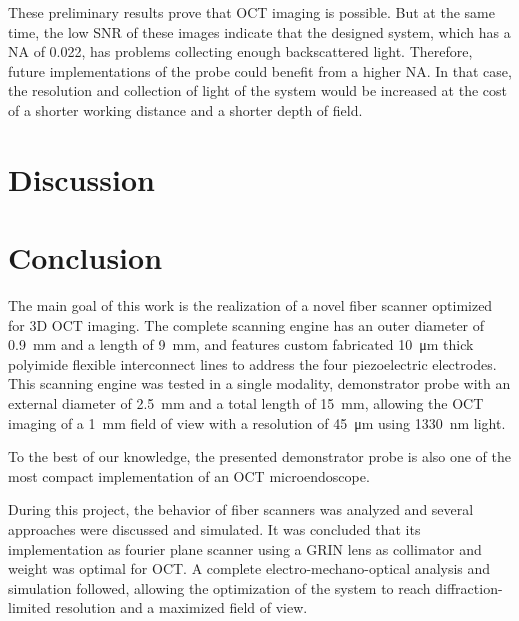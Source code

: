 \documentclass[10pt]{iopart}
\begin{document}
These preliminary results prove that OCT imaging is possible. But at the same time, the low SNR of these images indicate that the designed system, which has a NA of 0.022, has problems collecting enough backscattered light. Therefore, future implementations of the probe could benefit from a higher NA. In that case, the resolution and collection of light of the system would be increased at the cost of a shorter working distance and a shorter depth of field. 



\section{Discussion}


\section{Conclusion}

The main goal of this work is the realization of a novel fiber scanner optimized for 3D OCT imaging. The complete scanning engine has an outer diameter of \SI{0.9}{\milli\meter} and a length of \SI{9}{\milli\meter}, and features custom fabricated \SI{10}{\micro\meter} thick polyimide flexible interconnect lines to address the four piezoelectric electrodes. This scanning engine was tested in a single modality, demonstrator probe with an external diameter of \SI{2.5}{\milli\meter} and a total length of \SI{15}{\milli\meter}, allowing the OCT imaging of a \SI{1}{\milli\meter} field of view with a resolution of \SI{45}{\micro\meter} using \SI{1330}{\nano\meter} light. 

To the best of our knowledge, the presented demonstrator probe is also one of the most compact implementation of an OCT microendoscope.

During this project, the behavior of fiber scanners was analyzed and several approaches were discussed and simulated. It was concluded that its implementation as fourier plane scanner using a GRIN lens as collimator and weight was optimal for OCT. A complete electro-mechano-optical analysis and simulation followed, allowing the optimization of the system to reach diffraction-limited resolution and a maximized field of view.
\end{document}
